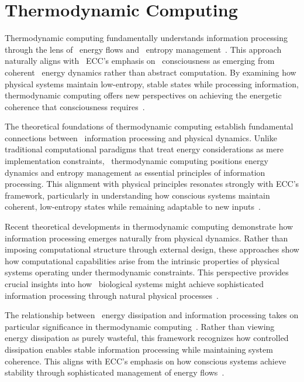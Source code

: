 \section{Thermodynamic Computing}

 Thermodynamic computing fundamentally understands information processing through the lens of~ energy flows and~ entropy management~\cite{Bennett2019,Wolpert2019}. This approach naturally aligns with~ ECC's emphasis on~ consciousness as emerging from coherent~ energy dynamics rather than abstract computation. By examining how physical systems maintain low-entropy, stable states while processing information, thermodynamic computing offers new perspectives on achieving the energetic coherence that consciousness requires~\cite{Still2020,Adamatzky2020b}.

The theoretical foundations of thermodynamic computing establish fundamental connections between~ information processing and physical dynamics. Unlike traditional computational paradigms that treat energy considerations as mere implementation constraints,~ thermodynamic computing positions energy dynamics and entropy management as essential principles of information processing. This alignment with physical principles resonates strongly with ECC's framework, particularly in understanding how conscious systems maintain coherent, low-entropy states while remaining adaptable to new inputs~\cite{England2018,friston2010free}.

Recent theoretical developments in thermodynamic computing demonstrate how information processing emerges naturally from physical dynamics. Rather than imposing computational structure through external design, these approaches show how computational capabilities arise from the intrinsic properties of physical systems operating under thermodynamic constraints. This perspective provides crucial insights into how~ biological systems might achieve sophisticated information processing through natural physical processes~\cite{Hinrichsen2019,demetrius2015}.

The relationship between~ energy dissipation and information processing takes on particular significance in thermodynamic computing~\cite{Kolchinsky2020}. Rather than viewing energy dissipation as purely wasteful, this framework recognizes how controlled dissipation enables stable information processing while maintaining system coherence. This aligns with ECC's emphasis on how conscious systems achieve stability through sophisticated management of energy flows~\cite{Maroney2019,mcfadden2020integrating}.

